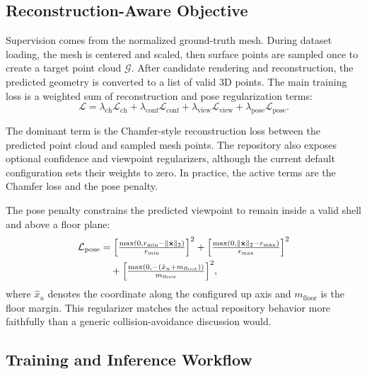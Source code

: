 \subsection{Reconstruction-Aware Objective}
\label{sec:loss}

Supervision comes from the normalized ground-truth mesh. During dataset loading, the mesh is centered and scaled, then surface points are sampled once to create a target point cloud $\mathcal{G}$. After candidate rendering and reconstruction, the predicted geometry is converted to a list of valid 3D points. The main training loss is a weighted sum of reconstruction and pose regularization terms:
\begin{equation}
    \mathcal{L}
    =
    \lambda_{\mathrm{ch}}\mathcal{L}_{\mathrm{ch}}
    +
    \lambda_{\mathrm{conf}}\mathcal{L}_{\mathrm{conf}}
    +
    \lambda_{\mathrm{view}}\mathcal{L}_{\mathrm{view}}
    +
    \lambda_{\mathrm{pose}}\mathcal{L}_{\mathrm{pose}}.
\end{equation}

The dominant term is the Chamfer-style reconstruction loss between the predicted point cloud and sampled mesh points. The repository also exposes optional confidence and viewpoint regularizers, although the current default configuration sets their weights to zero. In practice, the active terms are the Chamfer loss and the pose penalty.

The pose penalty constrains the predicted viewpoint to remain inside a valid shell and above a floor plane:
\begin{align}
    \mathcal{L}_{\mathrm{pose}} &=
    \Bigl[\tfrac{\max(0, r_{\min} - \lVert \hat{\mathbf{x}} \rVert_2)}{r_{\min}}\Bigr]^2
    +
    \Bigl[\tfrac{\max(0, \lVert \hat{\mathbf{x}} \rVert_2 - r_{\max})}{r_{\max}}\Bigr]^2 \notag \\
    &\quad +
    \Bigl[\tfrac{\max(0, -(\hat{x}_{u} + m_{\mathrm{floor}}))}{m_{\mathrm{floor}}}\Bigr]^2,
\end{align}
where $\hat{x}_{u}$ denotes the coordinate along the configured up axis and $m_{\mathrm{floor}}$ is the floor margin. This regularizer matches the actual repository behavior more faithfully than a generic collision-avoidance discussion would.

\subsection{Training and Inference Workflow}
\label{sec:workflow}

